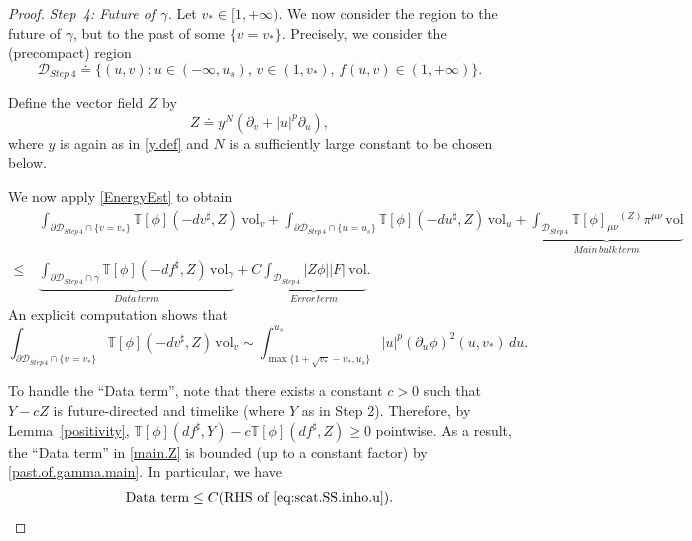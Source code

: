 \documentclass[10pt, reqno]{amsart}
\theoremstyle{definition}
\theoremstyle{remark}
\numberwithin{equation}{section}
\newcommand{\rd}{\partial}
\newcommand{\0}{\emptyset}
\newcommand{\pfstep}[1]{\vspace{.5em} {\it #1.}}
\newcommand{\vol}{\mathrm{vol}}
\begin{document}
\begin{proof}
\pfstep{Step~4: Future of $\gamma$} Let $v_*\in [1,+\infty)$. We now consider the region to the future of $\gamma$, but to the past of some $\{v=v_*\}$. Precisely, we consider the (precompact) region
$$\mathcal D_{Step\,4}  \doteq  \{(u,v): u\in (-\infty,u_s),\, v\in (1,v_*),\, f(u,v) \in (1,+\infty) \}.$$

Define the vector field $Z$ by
$$ Z \doteq  y^N  ( \rd_v+|u|^{p}\rd_u),$$
where $y$ is again as in \eqref{y.def} and $N$ is a sufficiently large constant to be chosen below.

We now apply \eqref{EnergyEst} to obtain
\begin{equation}\label{main.Z}
\begin{split}
&\:\int_{\rd\mathcal D_{Step\,4}\cap\{v = v_*\}} \mathbb T[\phi](-dv^\sharp, Z)\, \vol_v+ \int_{\rd\mathcal D_{Step\,4}\cap\{u=u_s\}} \mathbb T[\phi](-du^\sharp, Z)\, \vol_u +\underbrace{\int_{\mathcal D_{Step\,4}} \mathbb T[\phi]_{\mu\nu}{ }^{(Z)}\pi^{\mu\nu} \, \vol}_{Main\,bulk\,term}\\
\leq &\:\underbrace{\int_{\rd\mathcal D_{Step\,4}\cap \gamma} \mathbb T[\phi](-df^\sharp, Z)\,\vol_{\gamma}}_{Data\,term}+C\underbrace{\int_{\mathcal D_{Step\,4}}|Z\phi| |F|\, \vol}_{Error\,term}.
\end{split}
\end{equation}
An explicit computation shows that
\begin{equation}\label{Z.1}
\int_{\rd\mathcal D_{Step\,4}\cap\{v = v_*\}} \mathbb T[\phi](-dv^\sharp, Z)\, \vol_v \sim \int_{\max\{1+\sqrt{v_*}-v_*,u_s\}}^{u_s} |u|^p(\rd_u\phi)^2(u,v_*)\, du.
\end{equation}

To handle the ``Data term'', note that there exists a constant $c>0$ such that $Y-cZ$ is future-directed and timelike (where $Y$ as in Step 2). Therefore, by Lemma~\ref{positivity}, $\mathbb T[\phi](df^\sharp, Y) - c\mathbb T[\phi](df^\sharp, Z) \geq 0$ pointwise. As a result, the ``Data term'' in \eqref{main.Z} is bounded (up to a constant factor) by \eqref{past.of.gamma.main}. In particular, we have
\begin{equation}\label{Z.2}
\begin{split}
\mbox{Data term}\leq C\mbox{(RHS of \eqref{eq:scat.SS.inho.u})}.
\end{split}
\end{equation}


\end{proof}
\end{document}
